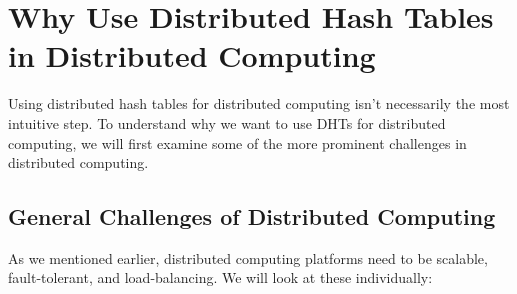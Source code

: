 \section{Why Use Distributed Hash Tables in Distributed Computing}

Using distributed hash tables for distributed computing isn't necessarily the most intuitive step.
To understand why we want to use DHTs for distributed computing, we will first examine some of the more prominent challenges in distributed computing.

\subsection{General Challenges of Distributed Computing}
\label{sec:challenges}

As we mentioned earlier, distributed computing platforms need to be scalable, fault-tolerant, and load-balancing.
We will look at these individually:



